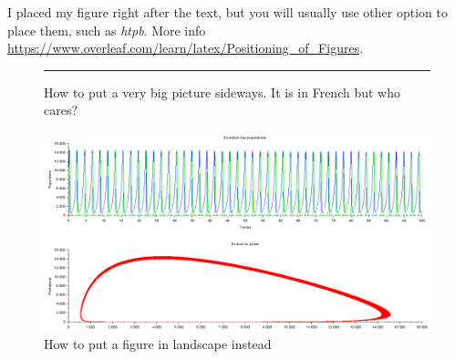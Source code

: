 \documentclass[../Thesis]{subfiles}
\begin{document}
I placed my figure right after the text, but you will usually use other option to place them, such as \textit{htpb}. More info \url{https://www.overleaf.com/learn/latex/Positioning_of_Figures}. 

\begin{figure}[H] 
    \centering 
    \rule{35em}{0.5pt} 
    \caption[Sideways picture]{How to put a very big picture sideways. It is in French but who cares?} 
    \label{fig:veryBigFigure} 
\end{figure}


\begin{landscape}
\begin{figure}[!h]
    \centering
    \includegraphics[width=\linewidth]{Figures/rk4_0-100_dt-0-0001}
    \caption{How to put a figure in landscape instead}
    \label{fig:verybigfigure2}
\end{figure}
\end{landscape}
\end{document}
